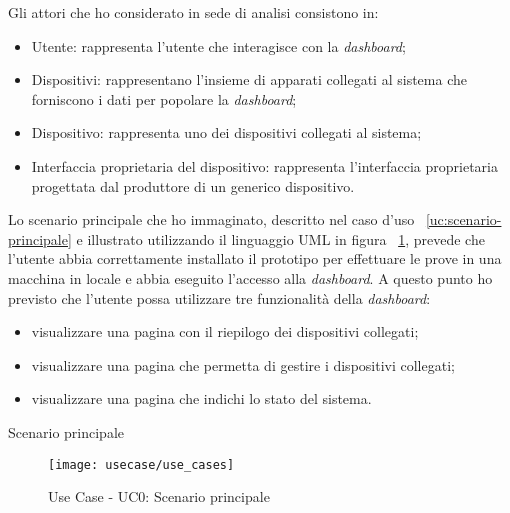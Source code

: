 Gli attori che ho considerato in sede di analisi consistono in:
\begin{itemize}
	\item Utente: rappresenta l'utente che interagisce con la \emph{dashboard};
	\item Dispositivi: rappresentano l'insieme di apparati collegati al sistema che forniscono i dati per popolare la \emph{dashboard};
	\item Dispositivo: rappresenta uno dei dispositivi collegati al sistema;
	\item Interfaccia proprietaria del dispositivo: rappresenta l'interfaccia proprietaria progettata dal produttore di un generico dispositivo.
\end{itemize}


Lo scenario principale che ho immaginato, descritto nel caso d'uso ~\ref{uc:scenario-principale} e illustrato utilizzando il linguaggio UML in figura ~\ref{fig:scenario-principale}, prevede che l'utente abbia correttamente installato il prototipo per effettuare le prove in una macchina in locale e abbia eseguito l'accesso alla \emph{dashboard}. A questo punto ho previsto che l'utente possa utilizzare tre funzionalità della \emph{dashboard}:
\begin{itemize}
  \item visualizzare una pagina con il riepilogo dei dispositivi collegati;
  \item visualizzare una pagina che permetta di gestire i dispositivi collegati;
  \item visualizzare una pagina che indichi lo stato del sistema.
\end{itemize}

\begin{usecase}{0}{Scenario principale}
\label{uc:scenario-principale}
\end{usecase}

\begin{figure}[!h]
    \centering
    \texttt{[image: usecase/use\_cases]}
    \caption{Use Case - UC0: Scenario principale}
    \label{fig:scenario-principale}
\end{figure}

